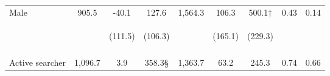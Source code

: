 \begin{tabular}{lcccccccc}
\noalign{\smallskip}Male & 905.5 & -40.1 & 127.6 & 1,564.3 & 106.3 & 500.1† & 0.43 & 0.14\\
 & \begin{footnotesize}\end{footnotesize} & \begin{footnotesize}(111.5)\end{footnotesize} & \begin{footnotesize}(106.3)\end{footnotesize} & \begin{footnotesize}\end{footnotesize} & \begin{footnotesize}(165.1)\end{footnotesize} & \begin{footnotesize}(229.3)\end{footnotesize} & \begin{footnotesize}\end{footnotesize} & \begin{footnotesize}\end{footnotesize}\\
 & \begin{footnotesize}\end{footnotesize} & \begin{footnotesize}[1.000]\end{footnotesize} & \begin{footnotesize}[0.090]\end{footnotesize} & \begin{footnotesize}\end{footnotesize} & \begin{footnotesize}[1.000]\end{footnotesize} & \begin{footnotesize}[0.160]\end{footnotesize} & \begin{footnotesize}\end{footnotesize} & \begin{footnotesize}\end{footnotesize}\\
\noalign{\smallskip}Active searcher & 1,096.7 & 3.9 & 358.3§ & 1,363.7 & 63.2 & 245.3 & 0.74 & 0.66\\

\end{tabular}
